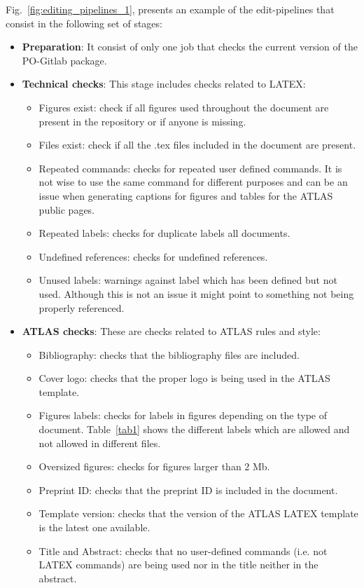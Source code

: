 Fig.~\ref{fig:editing_pipelines_1}, presents an example of the edit-pipelines that consist in the following set of stages:
\begin{itemize}

\item \textbf{Preparation}: It consist of only one job that checks the current version of the PO-Gitlab package. 

\item \textbf{Technical checks}: This stage includes checks related to LATEX:

    {\begin{itemize}
    \item Figures exist: check if all figures used throughout the document are present in the repository or if anyone is missing.
    \item Files exist: check if all the .tex files included in the document are present.
    \item Repeated commands: checks for repeated user defined commands. It is not wise to use the same command for different purposes and can be an issue when generating captions for figures and tables for the ATLAS public pages.
    \item Repeated labels: checks for duplicate labels all documents.
    \item Undefined references: checks for undefined references.
    \item Unused labels: warnings against label which has been defined but not used. Although this is not an issue it might point to something not being properly referenced.
    \end{itemize}}
    
\item \textbf{ATLAS checks}: These are checks related to ATLAS rules and style:

    {\begin{itemize}
    \item Bibliography: checks that the bibliography files are included.
    \item Cover logo: checks that the proper logo is being used in the ATLAS template.
    \item Figures labels: checks for labels in figures depending on the type of document. Table~\ref{tab1} shows the different labels which are allowed and not allowed in different files.
    \item Oversized figures: checks for figures larger than 2 Mb.
    \item Preprint ID: checks that the preprint ID is included in the document.
    \item Template version: checks that the version of the ATLAS LATEX template is the latest one available.
    \item Title and Abstract: checks that no user-defined commands (i.e. not LATEX commands) are being used nor in the title neither in the abstract.
   \end{itemize}}
   

\end{itemize}
